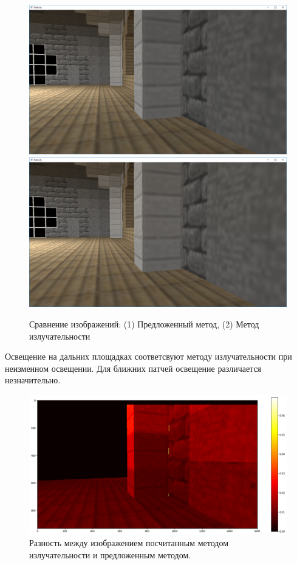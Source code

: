 \documentclass[oneside,final,12pt, a4paper]{extreport}
\begin{document}
\begin{figure}[htb]
  \begin{center}
  \includegraphics[width=0.48\linewidth]{img/ADynamic_radiosity.png}
  \includegraphics[width=0.48\linewidth]{img/ARadiosity.png}
  \caption{Сравнение изображений: (1) Предложенный метод, (2) Метод излучательности}
  \label{fig:ImageComparison2}
  \end{center}
\end{figure}

Освещение на дальних площадках соответсвуют методу излучательности при неизменном освещении. Для ближних патчей освещение различается незначительно.

\begin{figure}[htb]
  \begin{center}
  \includegraphics[width=\linewidth]{img/Diff.png}
  \caption{Разность между изображением посчитанным методом излучательности и предложенным методом.}
  \label{fig:Diff}
  \end{center}
\end{figure}
\end{document}
